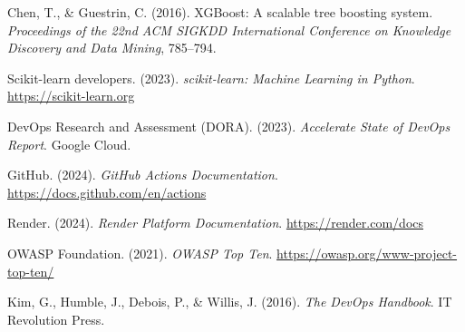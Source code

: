 \documentclass[12pt,a4paper]{article}
\begin{document}
\begin{enumerate}[label={[\arabic*]}]
  \item Chen, T., \& Guestrin, C. (2016). XGBoost: A scalable tree boosting system. \textit{Proceedings of the 22nd ACM SIGKDD International Conference on Knowledge Discovery and Data Mining}, 785--794.
  \item Scikit-learn developers. (2023). \textit{scikit-learn: Machine Learning in Python}. \url{https://scikit-learn.org}
  \item DevOps Research and Assessment (DORA). (2023). \textit{Accelerate State of DevOps Report}. Google Cloud.
  \item GitHub. (2024). \textit{GitHub Actions Documentation}. \url{https://docs.github.com/en/actions}
  \item Render. (2024). \textit{Render Platform Documentation}. \url{https://render.com/docs}
  \item OWASP Foundation. (2021). \textit{OWASP Top Ten}. \url{https://owasp.org/www-project-top-ten/}
  \item Kim, G., Humble, J., Debois, P., \& Willis, J. (2016). \textit{The DevOps Handbook}. IT Revolution Press.
\end{enumerate}
\end{document}
